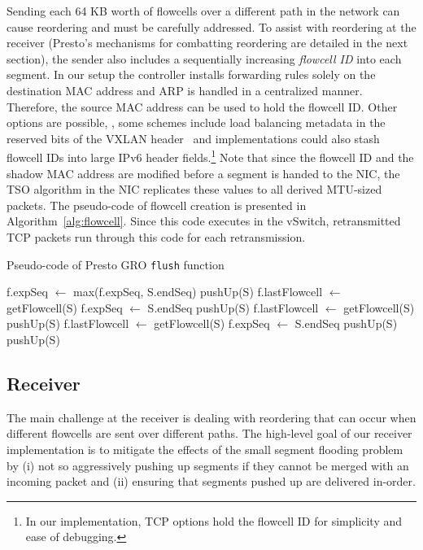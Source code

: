 Sending each 64 KB worth of flowcells over a different path in the network can cause reordering and must
be carefully addressed.
To assist with reordering at the receiver (Presto's mechanisms for combatting reordering are detailed in the next section), 
the sender also includes a sequentially increasing {\em flowcell ID} into each segment.
In our setup the controller installs forwarding rules solely on the destination MAC address and
ARP is handled in a centralized manner. Therefore,
the source MAC address can be used to hold the flowcell ID. Other options are possible, 
\eg{}, some schemes include load balancing metadata in the reserved bits of the VXLAN header~\cite{nvo3}
and implementations could also stash flowcell IDs into large IPv6 header fields.\footnote{In our
implementation, TCP options hold the flowcell ID for simplicity and ease of debugging.}
Note that since the flowcell ID and the shadow MAC address are modified before a segment is handed to the NIC,
the TSO algorithm in the NIC replicates these values to all derived MTU-sized packets.
The pseudo-code of flowcell creation is presented in Algorithm~\ref{alg:flowcell}.
Since this code executes in the vSwitch, retransmitted TCP packets run through this code for each retransmission.

\begin{algorithm}[!t]
\caption{Pseudo-code of Presto GRO {\tt flush} function}
\label{alg:gro}
\begin{algorithmic}[1]
\STATE f.expSeq $\leftarrow$ max(f.expSeq, S.endSeq)
\STATE pushUp(S)
\STATE f.lastFlowcell $\leftarrow$ getFlowcell(S)
\STATE f.expSeq $\leftarrow$ S.endSeq
\STATE pushUp(S)
\STATE f.lastFlowcell $\leftarrow$ getFlowcell(S)
\STATE pushUp(S)
\STATE f.lastFlowcell $\leftarrow$ getFlowcell(S)
\STATE f.expSeq $\leftarrow$ S.endSeq
\STATE pushUp(S)
\ENDIF
\ELSE
\STATE pushUp(S)
\ENDIF
\ENDFOR
\ENDFOR
\end{algorithmic}
\end{algorithm}

\subsection{Receiver}
The main challenge at the receiver is dealing with reordering that can occur when different flowcells
are sent over different paths. The high-level goal of our receiver implementation is
to mitigate the effects of the small segment flooding problem by (i) not so aggressively pushing
up segments if they cannot be merged with an incoming packet and (ii) ensuring that segments
pushed up are delivered in-order.

